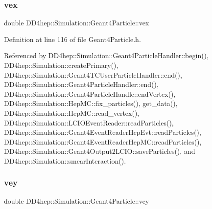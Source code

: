 \hypertarget{class_d_d4hep_1_1_simulation_1_1_geant4_particle_a28b83040272870e04caff34da5846464}{}\label{class_d_d4hep_1_1_simulation_1_1_geant4_particle_a28b83040272870e04caff34da5846464} 
\subsubsection{\texorpdfstring{vex}{vex}}
{\footnotesize\ttfamily double D\+D4hep\+::\+Simulation\+::\+Geant4\+Particle\+::vex}



Definition at line 116 of file Geant4\+Particle.\+h.



Referenced by D\+D4hep\+::\+Simulation\+::\+Geant4\+Particle\+Handler\+::begin(), D\+D4hep\+::\+Simulation\+::create\+Primary(), D\+D4hep\+::\+Simulation\+::\+Geant4\+T\+C\+User\+Particle\+Handler\+::end(), D\+D4hep\+::\+Simulation\+::\+Geant4\+Particle\+Handler\+::end(), D\+D4hep\+::\+Simulation\+::\+Geant4\+Particle\+Handle\+::end\+Vertex(), D\+D4hep\+::\+Simulation\+::\+Hep\+M\+C\+::fix\+\_\+particles(), get\+\_\+data(), D\+D4hep\+::\+Simulation\+::\+Hep\+M\+C\+::read\+\_\+vertex(), D\+D4hep\+::\+Simulation\+::\+L\+C\+I\+O\+Event\+Reader\+::read\+Particles(), D\+D4hep\+::\+Simulation\+::\+Geant4\+Event\+Reader\+Hep\+Evt\+::read\+Particles(), D\+D4hep\+::\+Simulation\+::\+Geant4\+Event\+Reader\+Hep\+M\+C\+::read\+Particles(), D\+D4hep\+::\+Simulation\+::\+Geant4\+Output2\+L\+C\+I\+O\+::save\+Particles(), and D\+D4hep\+::\+Simulation\+::smear\+Interaction().

\hypertarget{class_d_d4hep_1_1_simulation_1_1_geant4_particle_a1befe26ea99280bd0a57d6d858165ef6}{}\label{class_d_d4hep_1_1_simulation_1_1_geant4_particle_a1befe26ea99280bd0a57d6d858165ef6} 
\subsubsection{\texorpdfstring{vey}{vey}}
{\footnotesize\ttfamily double D\+D4hep\+::\+Simulation\+::\+Geant4\+Particle\+::vey}



